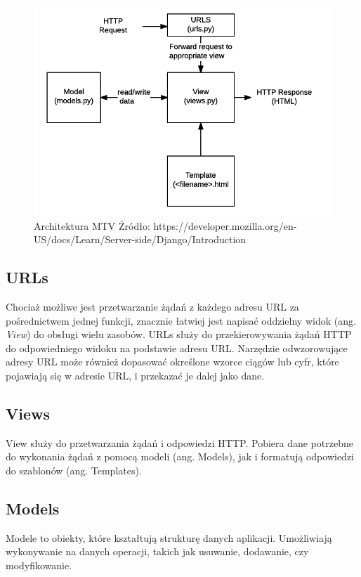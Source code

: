 \documentclass[oneside,polski,logo,indent]{amuthesis}
\begin{document}
\begin{figure}[H]
\centering
\includegraphics[width=14cm]{mtv.png}
\caption{Architektura MTV\newline
Źródło: https://developer.mozilla.org/en-US/docs/Learn/Server-side/Django/Introduction}
\label{MTV}
\end{figure}

\begin{center}
\subsection{URLs}
\end{center}
Chociaż możliwe jest przetwarzanie żądań z każdego adresu URL za pośrednictwem jednej funkcji, znacznie łatwiej jest napisać oddzielny widok (ang. \emph{View}) do obsługi wielu zasobów. URLs służy do przekierowywania żądań HTTP do odpowiedniego widoku na podstawie adresu URL. Narzędzie odwzorowujące adresy URL może również dopasować określone wzorce ciągów lub cyfr, które pojawiają się w adresie URL, i przekazać je dalej jako dane.

\begin{center}
\subsection{Views}
\end{center}
View służy do przetwarzania żądań i odpowiedzi HTTP. Pobiera dane potrzebne do wykonania żądań z pomocą modeli (ang. Models), jak i formatują odpowiedzi do szablonów (ang. Templates).


\begin{center}
\subsection{Models}
\end{center}
Modele to obiekty, które kształtują strukturę danych aplikacji. Umożliwiają wykonywanie na danych operacji, takich jak usuwanie, dodawanie, czy modyfikowanie. 
\end{document}
